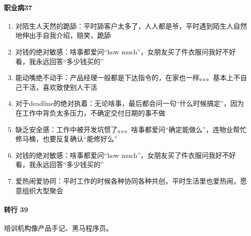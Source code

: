 \documentclass[letterpaper,11pt,english]{sphinxmanual}
\begin{document}
\paragraph{职业病37\sphinxfootnotemark[170]}
\label{\detokenize{chapter_introduction/PM:id60}}%
\begin{footnotetext}[170]\sphinxAtStartFootnote
{}
%
\end{footnotetext}\ignorespaces \begin{enumerate}
%
\item {} 
对陌生人天然的跪舔：平时舔客户太多了，人人都是爷，平时遇到陌生人自然地伸出手自我介绍，赔笑，跪舔

\item {} 
对钱的绝对敏感：啥事都爱问“how
much”，女朋友买了件衣服问我好不好看，我永远回答“多少钱买的”

\item {} 
能动嘴绝不动手：产品经理一般都是下达指令的，在家也一样。。。基本上不自己干活，喜欢致使别人干活

\item {} 
对于deadline的绝对执着：无论啥事，最后都会问一句“什么时候搞定”，因为在工作中背负太多压力，不确定交付日期的事不做

\item {} 
缺乏安全感：工作中被开发坑惯了。。。啥事都爱问“确定能做么”，连物业帮忙修马桶，也要反复确认“能修好么”

\item {} 
对钱的绝对敏感：啥事都爱问“how
much”，女朋友买了件衣服问我好不好看，我永远回答“多少钱买的”

\item {} 
爱热闹爱协同：平时工作的时候各种协同各种共创，平时生活里也爱热闹，愿意组织大型聚会

\end{enumerate}


\paragraph{转行 39\sphinxfootnotemark[171]}
\label{\detokenize{chapter_introduction/PM:id61}}%
\begin{footnotetext}[171]\sphinxAtStartFootnote
{}
%
\end{footnotetext}\ignorespaces 
培训机构像产品手记、黑马程序员。%
\begin{footnote}[172]\sphinxAtStartFootnote
{}
%
\end{footnote}
\end{document}
